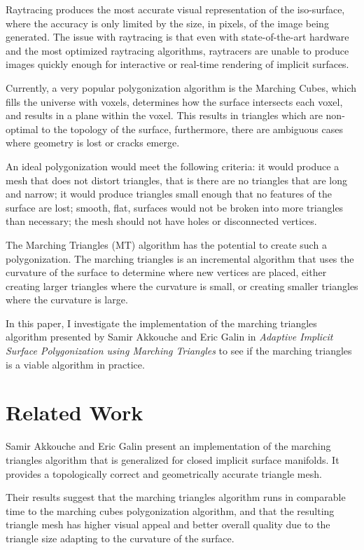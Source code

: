 \documentclass[conference]{acmsiggraph}
\begin{document}
Raytracing produces the most accurate visual representation of the
iso-surface, where the accuracy is only limited by the size, in pixels, of the
image being generated. The issue with raytracing is that even with
state-of-the-art hardware and the most optimized raytracing algorithms,
raytracers are unable to produce images quickly enough for interactive or
real-time rendering of implicit surfaces.

Currently, a very popular polygonization algorithm is the Marching Cubes, which
fills the universe with voxels, determines how the surface intersects each
voxel, and results in a plane within the voxel. This results in triangles which
are non-optimal to the topology of the surface, furthermore, there are
ambiguous cases where geometry is lost or cracks emerge.

An ideal polygonization would meet the following criteria:
it would produce a mesh that does not distort triangles, that is there are no
triangles that are long and narrow; it would produce triangles small enough
that no features of the surface are lost; smooth, flat, surfaces would not be
broken into more triangles than necessary; the mesh should not have holes or
disconnected vertices.

The Marching Triangles (MT) algorithm has the potential to create such a
polygonization. The marching triangles is an incremental algorithm that uses
the curvature of the surface to determine where new vertices are placed, either
creating larger triangles where the curvature is small, or creating smaller
triangles where the curvature is large.

In this paper, I investigate the implementation of the marching triangles
algorithm presented by Samir Akkouche and Eric Galin in \textit{Adaptive
Implicit Surface Polygonization using Marching Triangles} to see if the
marching triangles is a viable algorithm in practice.


\section{Related Work}

Samir Akkouche and Eric Galin present an implementation of the marching
triangles algorithm that is generalized for closed implicit surface manifolds.
It provides a topologically correct and geometrically accurate triangle mesh.

Their results suggest that the marching triangles algorithm runs in comparable
time to the marching cubes polygonization algorithm, and that the resulting
triangle mesh has higher visual appeal and better overall quality due to the
triangle size adapting to the curvature of the surface.
\end{document}
